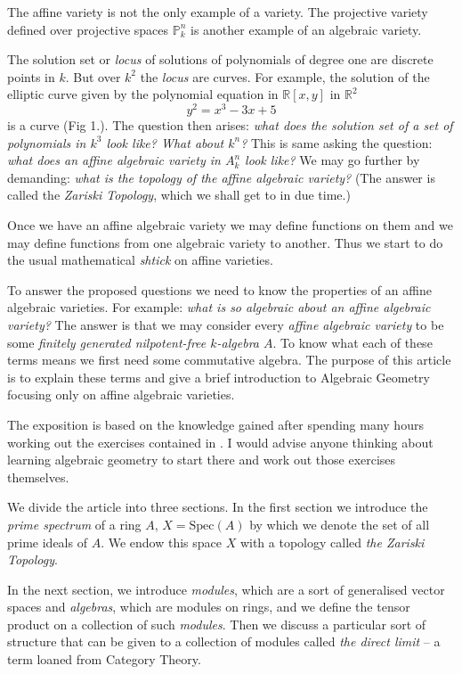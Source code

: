 \documentclass[]{report}
\begin{document}
The affine variety is not the only example of a variety. The projective variety defined over projective spaces $\mathbb{P}^n_k$ is another example of an algebraic variety.

The solution set or \textit{locus} of solutions of polynomials of degree one are discrete points in $k$. But over $k^2$ the \textit{locus} are curves. For example, the solution of the elliptic curve given by the polynomial equation in $\mathbb{R}[x,y]$ in $\mathbb{R}^2$  
    $$y^2 = x^3 - 3x + 5$$
    is a curve (Fig 1.). The question then arises: \textit{what does the solution set of a set of polynomials in $k^3$ look like? What about $k^n$?} This is same asking the question: \textit{what does an affine algebraic variety in $A^n_k$ look like?} We may go further by demanding: \textit{what is the topology of the affine algebraic variety?} (The answer is called the \textit{Zariski Topology}, which we shall get to in due time.)

    Once we have an affine algebraic variety we may define functions on them and we may define functions from one algebraic variety to another. Thus we start to do the usual mathematical \textit{shtick} on affine varieties.

    To answer the proposed questions we need to know the properties of an affine algebraic varieties. For example: \textit{what is so algebraic about an affine algebraic variety?} The answer is that we may consider every \textit{affine algebraic variety} to be some \textit{finitely generated nilpotent-free $k$-algebra $A$}. To know what each of these terms means we first need some commutative algebra. The purpose of this article is to explain these terms and give a brief introduction to Algebraic Geometry focusing only on affine algebraic varieties.

    The exposition is based on the knowledge gained after spending many hours working out the exercises contained in \cite{atiyah1}. I would advise anyone thinking about learning algebraic geometry to start there and work out those exercises themselves.  

    We divide the article into three sections. In the first section we introduce the \textit{prime spectrum} of a ring $A$, $X = \text{Spec}(A)$ by which we denote the set of all prime ideals of $A$. We endow this space $X$ with a topology called \textit{the Zariski Topology}.

    In the next section, we introduce \textit{modules}, which are a sort of generalised vector spaces and \textit{algebras}, which are modules on rings, and we define the tensor product on a collection of such \textit{modules}. Then we discuss a particular sort of structure that can be given to a collection of modules called \textit{the direct limit} -- a term loaned from Category Theory. 
\end{document}
